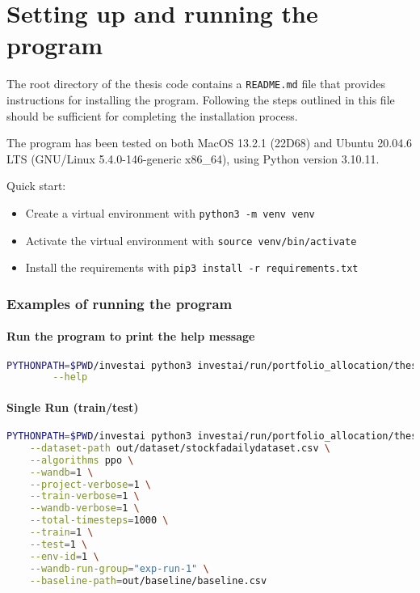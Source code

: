 \documentclass[../xlapes02]{subfiles}
\begin{document}
    \chapter{Setting up and running the program}
    The root directory of the thesis code contains a \texttt{README.md} file that provides instructions for installing the program. Following the steps outlined in this file should be sufficient for completing the installation process.

    The program has been tested on both MacOS 13.2.1 (22D68) and Ubuntu 20.04.6 LTS (GNU/Linux 5.4.0-146-generic x86\_64), using Python version 3.10.11.

    Quick start:
    \begin{itemize}
        \item Create a virtual environment with \texttt{python3 -m venv venv}
        \item Activate the virtual environment with \texttt{source venv/bin/activate}
        \item Install the requirements with \texttt{pip3 install -r requirements.txt}
    \end{itemize}

    \subsection{Examples of running the program}

    \subsubsection{Run the program to print the help message}
    \begin{lstlisting}[language=bash]
PYTHONPATH=$PWD/investai python3 investai/run/portfolio_allocation/thesis/train.py \
        --help
    \end{lstlisting}

    \subsubsection{Single Run (train/test)}
    \begin{lstlisting}[language=bash]
PYTHONPATH=$PWD/investai python3 investai/run/portfolio_allocation/thesis/train.py \
    --dataset-path out/dataset/stockfadailydataset.csv \
    --algorithms ppo \
    --wandb=1 \
    --project-verbose=1 \
    --train-verbose=1 \
    --wandb-verbose=1 \
    --total-timesteps=1000 \
    --train=1 \
    --test=1 \
    --env-id=1 \
    --wandb-run-group="exp-run-1" \
    --baseline-path=out/baseline/baseline.csv
    \end{lstlisting}
\end{document}
